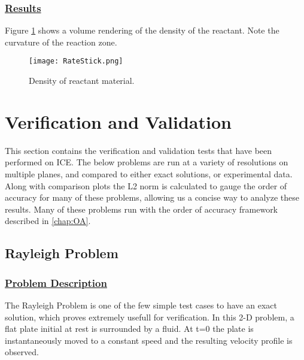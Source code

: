 \subsubsection*{\underline{Results}}
Figure \ref{fig:RateStick} shows a volume rendering of the density of the
reactant.  Note the curvature of the reaction zone.
\begin{figure}
 \texttt{[image: RateStick.png]}
\caption{Density of reactant material.}
\label{fig:RateStick}
\end{figure}
%
\newpage
\section{Verification and Validation}
This section contains the verification and validation tests that have been performed on ICE. The below problems are run at a variety of resolutions on multiple planes, and compared to either exact solutions, or experimental data. Along with comparison plots the L2 norm is calculated to gauge the order of accuracy for many of these problems, allowing us a concise way to analyze these results. Many of these problems run with the order of accuracy framework described in \ref{chap:OA}. 
%
\subsection*{\center Rayleigh Problem}
\subsubsection*{\underline{Problem Description}}
The Rayleigh Problem is one of the few simple test cases to have an exact solution, which proves extremely usefull for verification. In this 2-D problem, a flat plate initial at rest is surrounded by a fluid. At t=0 the plate is instantaneously moved to a constant speed and the resulting velocity profile is observed.



